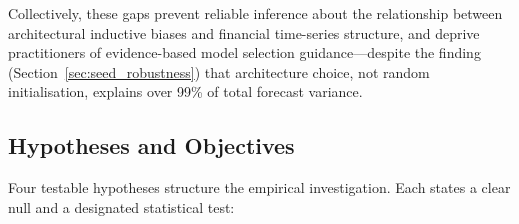 Collectively, these gaps prevent reliable inference about the relationship between architectural inductive biases and financial time-series structure, and deprive practitioners of evidence-based model selection guidance---despite the finding (Section~\ref{sec:seed_robustness}) that architecture choice, not random initialisation, explains over 99\% of total forecast variance.

\subsection{Hypotheses and Objectives}
\label{sec:hypotheses}

Four testable hypotheses structure the empirical investigation.  Each states a clear null and a designated statistical test:

